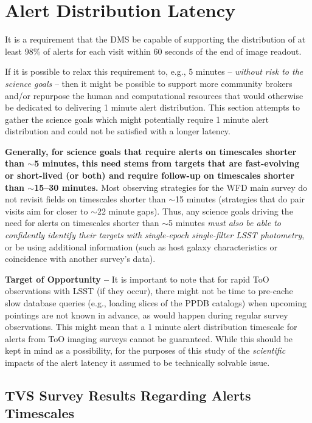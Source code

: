 \documentclass[DM,lsstdraft,authoryear,toc]{lsstdoc}
\begin{document}
\clearpage
\section{Alert Distribution Latency} \label{sec:latency}

It is a requirement that the DMS be capable of supporting the distribution of at least 98\% of alerts for each visit within 60 seconds of the end of image readout.

If it is possible to relax this requirement to, e.g., 5 minutes -- \emph{without risk to the science goals} -- then it might be possible to support more community brokers and/or repurpose the human and computational resources that would otherwise be dedicated to delivering 1 minute alert distribution. This section attempts to gather the science goals which might potentially require 1 minute alert distribution and could not be satisfied with a longer latency.

{\bf Generally, for science goals that require alerts on timescales shorter than $\sim$5 minutes, this need stems from targets that are fast-evolving or short-lived (or both) and require follow-up on timescales shorter than $\sim$15--30 minutes.} Most observing strategies for the WFD main survey do not revisit fields on timescales shorter than $\sim$15 minutes (strategies that do pair visits aim for closer to $\sim$22 minute gaps). Thus, any science goals driving the need for alerts on timescales shorter than $\sim$5 minutes \emph{must also be able to confidently identify their targets with single-epoch single-filter LSST photometry}, or be using additional information (such as host galaxy characteristics or coincidence with another survey's data). 

{\bf Target of Opportunity --} It is important to note that for rapid ToO observations with LSST (if they occur), there might not be time to pre-cache slow database queries (e.g., loading slices of the PPDB catalogs) when upcoming pointings are not known in advance, as would happen during regular survey observations. This might mean that a 1 minute alert distribution timescale for alerts from ToO imaging surveys cannot be guaranteed. While this should be kept in mind as a possibility, for the purposes of this study of the \emph{scientific} impacts of the alert latency it assumed to be technically solvable issue.


\subsection{TVS Survey Results Regarding Alerts Timescales}\label{ssec:latency_tvs}
\end{document}

